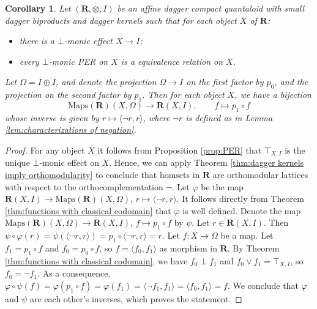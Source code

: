 \documentclass[12pt]{tac}
\newtheorem{corollary}[theorem]{Corollary}
\theoremstyle{definition}
\theoremstyle{remark}
\newcommand{\<}{\langle}
\renewcommand{\>}{\rangle}
\renewcommand{\:}{\colon}
\begin{document}
\begin{corollary}\label{cor:power objects condition}
   Let $(\mathbf R,\otimes,I)$ be an affine dagger compact quantaloid with small dagger biproducts and dagger kernels such that for each object $X$ of $\mathbf R$:
    \begin{itemize}
        \item[(1)] there is a $\bot$-monic effect $X\to I$;
        \item[(2)] every $\bot$-monic PER on $X$ is a equivalence relation on $X$.
        \end{itemize}
 Let $\Omega=I\oplus I$, and denote the projection $\Omega\to I$ on the first factor by $p_0$, and the projection on the second factor by $p_1$. Then for each object $X$, we have a bijection
 \[\mathrm{Maps}(\mathbf R)(X,\Omega)\to\mathbf R(X,I),\qquad f\mapsto p_1\circ f\]
 whose inverse is given by $r\mapsto\langle \neg r,r\rangle$, where 
$\neg r$ is defined as in Lemma \ref{lem:characterizations of negation}.
\end{corollary}
\begin{proof}
        For any object $X$ it follows from Proposition \ref{prop:PER} that $\top_{X,I}$ is the unique $\bot$-monic effect on $X$. Hence, we can apply Theorem \ref{thm:dagger kernels imply orthomodularity} to conclude that homsets in $\mathbf R$ are orthomodular lattices with respect to the orthocomplementation $\neg$.
Let $\varphi$ be the map $\mathbf R(X,I)\to\mathrm{Maps}(\mathbf R)(X,\Omega)$, $r\mapsto\langle \neg r,r\rangle$. It follows directly from Theorem \ref{thm:functions with classical codomain} that $\varphi$ is well defined. Denote the map $\mathrm{Maps}(\mathbf R)(X,\Omega)\to\mathbf R(X,I)$, $f\mapsto p_1\circ f$ by $\psi$. Let $r\in\mathbf R(X,I)$. Then $\psi\circ\varphi(r)=\psi(\langle \neg r,r\rangle)=p_1\circ\langle \neg r,r\rangle=r$. Let $f:X\to\Omega$ be a map. Let $f_1=p_1\circ f$ and $f_0=p_0\circ f$, so $f=\langle f_0,f_1\rangle$ as morphism in $\mathbf R$. By Theorem \ref{thm:functions with classical codomain}, we have $f_0\perp f_1$ and $f_0\vee f_1=\top_{X,I}$, so $f_0=\neg f_1$. 
As a consequence, $\varphi\circ\psi(f)=\varphi(p_1\circ f)=\varphi(f_1)=\langle \neg f_1,f_1\rangle=\langle f_0,f_1\rangle=f$.
We conclude that $\varphi$ and $\psi$ are each other's inverses, which proves the statement.
\end{proof}
\end{document}
